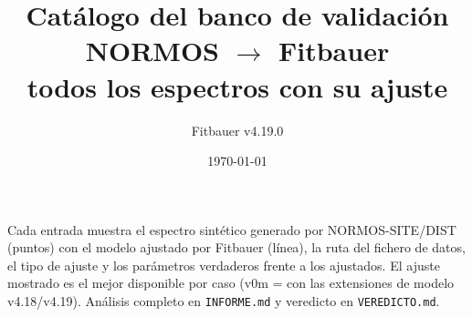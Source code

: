 \documentclass[10pt,a4paper]{article}
\title{Cat\'alogo del banco de validaci\'on NORMOS $\rightarrow$ Fitbauer\\
{\large todos los espectros con su ajuste}}
\author{Fitbauer v4.19.0}
\date{\today}
\begin{document}
\maketitle
Cada entrada muestra el espectro sint\'etico generado por NORMOS-SITE/DIST
(puntos) con el modelo ajustado por Fitbauer (l\'inea), la ruta del fichero
de datos, el tipo de ajuste y los par\'ametros verdaderos frente a los
ajustados. El ajuste mostrado es el mejor disponible por caso (v0m = con las
extensiones de modelo v4.18/v4.19). An\'alisis completo en
\texttt{INFORME.md} y veredicto en \texttt{VEREDICTO.md}.
\tableofcontents

\end{document}
